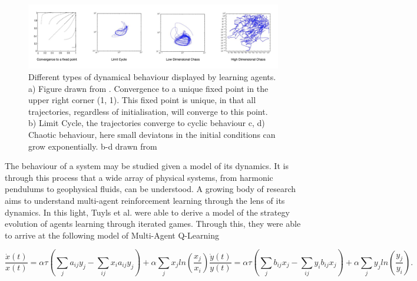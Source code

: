 \documentclass[.../main.tex]{subfiles}
\begin{document}
    \begin{figure}[h]
    	\centering
    	\includegraphics[width=1.1\textwidth]{Figures/DynamicalBehaviours}
    	\caption{ \label{fig::DynamicalBehaviours} Different types of dynamical behaviour
       displayed
    	by learning agents. a) Figure drawn from \cite{Tuyls2006AnGames}.
    	Convergence
    	to a unique fixed point in the upper right corner (1, 1). This fixed point is unique, in
    	that all trajectories, regardless of initialisation, will converge to this point. b) Limit Cycle, the trajectories converge to cyclic behaviour c,
    	d) Chaotic behaviour, here small deviatons in the initial conditions can grow
    	exponentially. b-d drawn from \cite{Sanders2018}}
    \end{figure}

    The behaviour of a system may be studied given a model of its
    dynamics. It is through this process that a wide array of physical
    systems, from harmonic pendulums to geophysical fluids, can be
    understood. A growing body of research aims to understand
    multi-agent reinforcement learning through the lens of its
    dynamics. In this light, Tuyls et al. \cite{Tuyls2006AnGames} were
    able to derive a model of the strategy evolution of agents
    learning through iterated games.  Through this, they were able to
    arrive at the following model of Multi-Agent Q-Learning

	\begin{subequations}
	\label{eqn::EOM}
		\begin{equation}
			\frac{\dot{x}(t)}{x(t)} = \alpha \tau (\sum_{j} a_{ij} y_j - \sum_{i j} x_i a_{ij} y_j)
			+ \alpha \sum_j x_j ln(\frac{x_j}{x_i}) 
		\end{equation}
		\begin{equation}
			\frac{\dot{y}(t)}{y(t)} = \alpha \tau (\sum_{j} b_{ij} x_j - \sum_{i j} y_i b_{ij} x_j)
			+ \alpha \sum_j y_j ln(\frac{y_j}{y_i}).
		\end{equation}
	\end{subequations}

\end{document}
